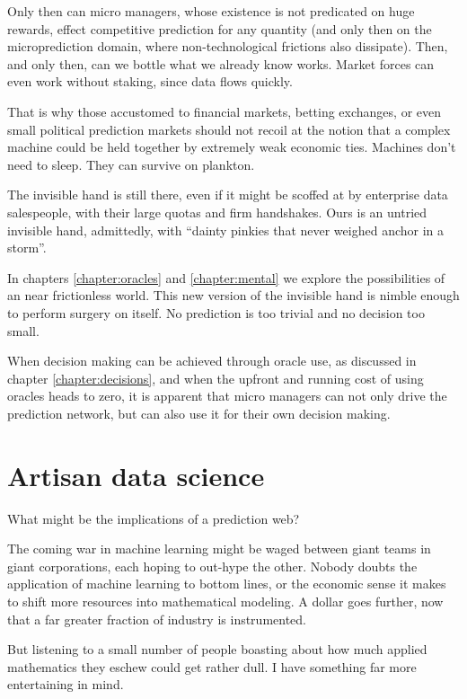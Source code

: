 Only then can micro managers, whose existence is not predicated on huge rewards, effect competitive prediction for any quantity (and only then on the microprediction domain, where non-technological frictions also dissipate).  Then, and only then, can we bottle what we already know works. Market forces can even work without staking, since data flows quickly. 


That is why those accustomed to financial markets, betting exchanges, or even small political prediction markets should not recoil at the notion that a complex machine could be held together by extremely weak economic ties. Machines don't need to sleep. They can survive on plankton. 


The invisible hand is still there, even if it might be scoffed at by enterprise data salespeople, with their large quotas and firm handshakes. Ours is an untried invisible hand, admittedly, with ``dainty pinkies that never weighed anchor in a storm''.


In chapters \ref{chapter:oracles} and \ref{chapter:mental} we explore the possibilities of an near frictionless world. This new version of the invisible hand is nimble enough to perform surgery on itself. No prediction is too trivial and no decision too small. 


When decision making can be achieved through oracle use, as discussed in chapter \ref{chapter:decisions}, and when the upfront and running cost of using oracles heads to zero, it is apparent that micro managers can not only drive the prediction network, but can also use it for their own decision making. 





\section{Artisan data science}
 
What might be the implications of a prediction web? 

The coming war in machine learning might be waged between giant teams in giant corporations, each hoping to out-hype the other. Nobody doubts the application of machine learning to bottom lines, or the economic sense it makes to shift more resources into mathematical modeling. A dollar goes further, now that a far greater fraction of industry is instrumented. 

But listening to a small number of people boasting about how much applied mathematics they eschew could get rather dull. I have something far more entertaining in mind. 

